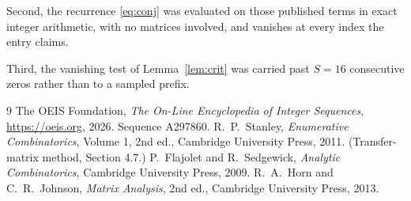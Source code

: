 \documentclass[11pt,a4paper]{article}
\theoremstyle{plain}
\theoremstyle{definition}
\begin{document}
Second, the recurrence \eqref{eq:conj} was evaluated on those published terms in exact
integer arithmetic, with no matrices involved, and vanishes at every index the entry claims.

Third, the vanishing test of Lemma~\ref{lem:crit} was carried past $S=16$ consecutive
zeros rather than to a sampled prefix.

\begin{thebibliography}{9}
 The OEIS Foundation, \emph{The On-Line Encyclopedia of Integer
Sequences}, \url{https://oeis.org}, 2026. Sequence A297860.
 R.~P.~Stanley, \emph{Enumerative Combinatorics}, Volume 1, 2nd ed.,
Cambridge University Press, 2011. (Transfer-matrix method, Section 4.7.)
 P.~Flajolet and R.~Sedgewick, \emph{Analytic Combinatorics}, Cambridge
University Press, 2009.
 R.~A.~Horn and C.~R.~Johnson, \emph{Matrix Analysis}, 2nd ed., Cambridge
University Press, 2013.
\end{thebibliography}
\end{document}
